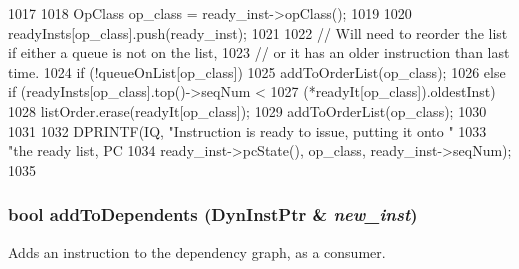 \begin{DoxyCode}
1017 {
1018     OpClass op_class = ready_inst->opClass();
1019 
1020     readyInsts[op_class].push(ready_inst);
1021 
1022     // Will need to reorder the list if either a queue is not on the list,
1023     // or it has an older instruction than last time.
1024     if (!queueOnList[op_class]) {
1025         addToOrderList(op_class);
1026     } else if (readyInsts[op_class].top()->seqNum  <
1027                (*readyIt[op_class]).oldestInst) {
1028         listOrder.erase(readyIt[op_class]);
1029         addToOrderList(op_class);
1030     }
1031 
1032     DPRINTF(IQ, "Instruction is ready to issue, putting it onto "
1033             "the ready list, PC %
1034             ready_inst->pcState(), op_class, ready_inst->seqNum);
1035 }
\end{DoxyCode}
\hypertarget{classInstructionQueue_abeb630fedb38de020599d2a1abd4b02d}{
\subsubsection[{addToDependents}]{\setlength{\rightskip}{0pt plus 5cm}bool addToDependents ({\bf DynInstPtr} \& {\em new\_\-inst})}}
\label{classInstructionQueue_abeb630fedb38de020599d2a1abd4b02d}
Adds an instruction to the dependency graph, as a consumer. 


